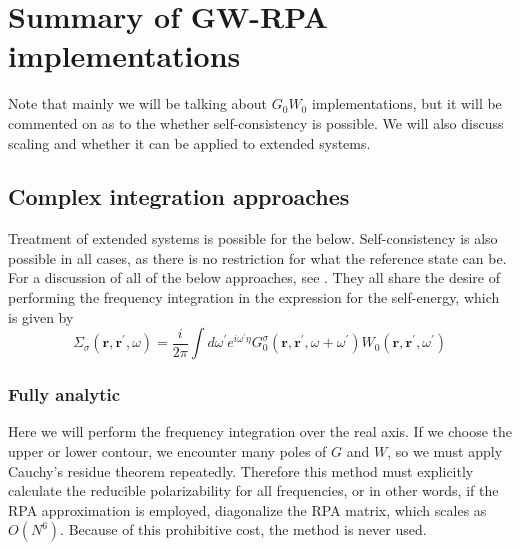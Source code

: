 \section{Summary of GW-RPA implementations}
Note that mainly we will be talking about $G_0W_0$ implementations, but it will be commented on as to the whether self-consistency is possible. We will also discuss scaling and whether it can be applied to extended systems.
\subsection{Complex integration approaches}
Treatment of extended systems is possible for the below. Self-consistency is also possible in all cases, as there is no restriction for what the reference state can be. For a discussion of all of the below approaches, see \cite{golze_gw_2019}. They all share the desire of performing the frequency integration in the expression for the self-energy, which is given by
\begin{equation}
\Sigma_\sigma\left(\mathbf{r}, \mathbf{r}^{\prime}, \omega\right)= \frac{i}{2 \pi} \int d \omega^{\prime} e^{i \omega^{\prime} \eta} G_0^\sigma\left(\mathbf{r}, \mathbf{r}^{\prime}, \omega+\omega^{\prime}\right) W_0\left(\mathbf{r}, \mathbf{r}^{\prime}, \omega^{\prime}\right)
\end{equation}
\subsubsection{Fully analytic}
 Here we will perform the frequency integration over the real axis. If we choose the upper or lower contour, we encounter many poles of $G$ and $W$, so we must apply Cauchy's residue theorem repeatedly. Therefore this method must explicitly calculate the reducible polarizability for all frequencies, or in other words, if the RPA approximation is employed, diagonalize the RPA matrix, which scales as $O(N^6)$. Because of this prohibitive cost, the method is never used.

